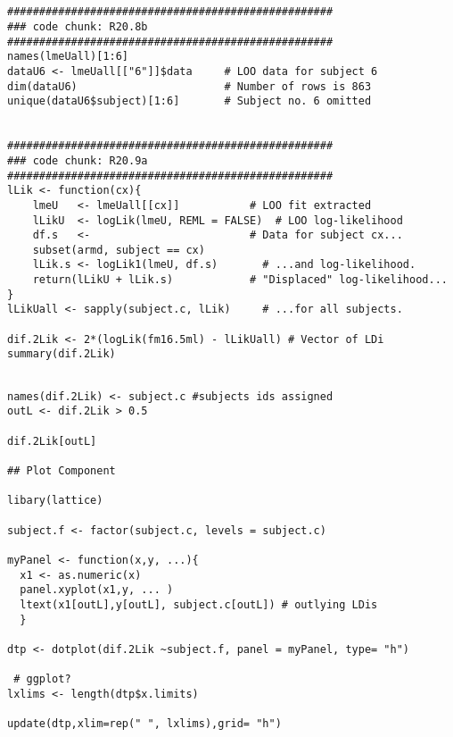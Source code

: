 \documentclass[a4paper,12pt]{article}
\begin{document}
\begin{framed}
	\begin{verbatim}


###################################################
### code chunk: R20.8b
###################################################
names(lmeUall)[1:6]                             
dataU6 <- lmeUall[["6"]]$data     # LOO data for subject 6
dim(dataU6)                       # Number of rows is 863
unique(dataU6$subject)[1:6]       # Subject no. 6 omitted


###################################################
### code chunk: R20.9a
###################################################
lLik <- function(cx){                  
	lmeU   <- lmeUall[[cx]]           # LOO fit extracted 
	lLikU  <- logLik(lmeU, REML = FALSE)  # LOO log-likelihood
	df.s   <-                         # Data for subject cx...
	subset(armd, subject == cx)                 
	lLik.s <- logLik1(lmeU, df.s)       # ...and log-likelihood.
	return(lLikU + lLik.s)            # "Displaced" log-likelihood...
}
lLikUall <- sapply(subject.c, lLik)     # ...for all subjects.         

dif.2Lik <- 2*(logLik(fm16.5ml) - lLikUall) # Vector of LDi
summary(dif.2Lik)

\end{verbatim}
\end{framed}

\begin{framed}
\begin{verbatim}

names(dif.2Lik) <- subject.c #subjects ids assigned
outL <- dif.2Lik > 0.5

dif.2Lik[outL]

## Plot Component

libary(lattice)

subject.f <- factor(subject.c, levels = subject.c)

myPanel <- function(x,y, ...){
  x1 <- as.numeric(x)
  panel.xyplot(x1,y, ... )
  ltext(x1[outL],y[outL], subject.c[outL]) # outlying LDis
  }

dtp <- dotplot(dif.2Lik ~subject.f, panel = myPanel, type= "h")

 # ggplot?
lxlims <- length(dtp$x.limits)

update(dtp,xlim=rep(" ", lxlims),grid= "h")
\end{verbatim}
\end{framed}

\end{document}
